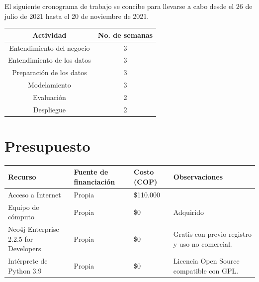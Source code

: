 \documentclass[11pt,letterpaper,oneside]{article}
\begin{document}
El siguiente cronograma de trabajo se concibe para llevarse a cabo desde el 26 de julio de 2021 hasta el 20 de noviembre de 2021.

\begin{center}
\begin{tabular}{ |c|c| }
 \hline
 \textbf{Actividad} & \textbf{No. de semanas}\\ 
 \hline
 Entendimiento del negocio & 3\\
 Entendimiento de los datos & 3\\
 Preparación de los datos & 3\\
 Modelamiento & 3\\
 Evaluación & 2\\
 Despliegue & 2 \\
 \hline
\end{tabular}
\end{center}

\section{Presupuesto}
\begin{center}
\begin{tabular}{ |p{3cm}|p{2cm}|p{1.5cm}|p{3cm}| }
 \hline
 \textbf{Recurso} & \textbf{Fuente de financiación} & \textbf{Costo (COP)} & \textbf{Observaciones}\\ 
 \hline
 Acceso a Internet & Propia & \$110.000 & \\ \hline
 Equipo de cómputo & Propia & \$0 & Adquirido\\ \hline
 Neo4j Enterprise 2.2.5 for Developers & Propia & \$0 & Gratis con previo registro y uso no comercial. \\ \hline
 Intérprete de Python 3.9 & Propia & \$0 & Licencia Open Source compatible con GPL. \\
 \hline
\end{tabular}
\end{center}

\newpage

\end{document}
